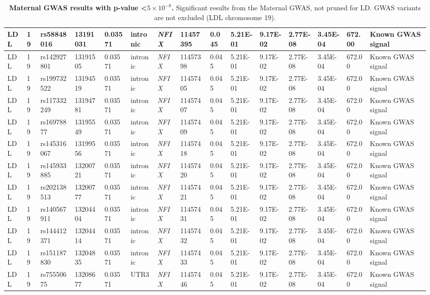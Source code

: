 \begin{landscape}
\begin{table}
\begin{adjustbox}{max width=\linewidth}
\begin{tabular}{@{}p{2cm}|p{0.5cm}p{2cm}p{2cm}p{1.5cm}p{3cm}p{2.1cm}p{1.5cm}p{1cm}p{2cm}p{2cm}p{2cm}p{2cm}p{1.5cm}p{4cm}@{}}
LDL&19&rs58848016&13191031&0.03571&intronic&\emph{NFIX}&11457395&0.045&5.21E-01&9.17E-02&2.77E-08&3.45E-04&672.00&Known GWAS signal\\ \hline
LDL&19&rs142927801&13191505&0.03571&intronic&\emph{NFIX}&11457398&0.045&5.21E-01&9.17E-02&2.77E-08&3.45E-04&672.00&Known GWAS signal\\ \hline
LDL&19&rs199732522&13194519&0.03571&intronic&\emph{NFIX}&11457405&0.045&5.21E-01&9.17E-02&2.77E-08&3.45E-04&672.00&Known GWAS signal\\ \hline
LDL&19&rs117332249&13194781&0.03571&intronic&\emph{NFIX}&11457407&0.045&5.21E-01&9.17E-02&2.77E-08&3.45E-04&672.00&Known GWAS signal\\ \hline
LDL&19&rs16978877&13195549&0.03571&intronic&\emph{NFIX}&11457409&0.045&5.21E-01&9.17E-02&2.77E-08&3.45E-04&672.00&Known GWAS signal\\ \hline
LDL&19&rs145316067&13199556&0.03571&intronic&\emph{NFIX}&11457418&0.045&5.21E-01&9.17E-02&2.77E-08&3.45E-04&672.00&Known GWAS signal\\ \hline
LDL&19&rs145933885&13200721&0.03571&intronic&\emph{NFIX}&11457420&0.045&5.21E-01&9.17E-02&2.77E-08&3.45E-04&672.00&Known GWAS signal\\ \hline
LDL&19&rs202138513&13200777&0.03571&intronic&\emph{NFIX}&11457421&0.045&5.21E-01&9.17E-02&2.77E-08&3.45E-04&672.00&Known GWAS signal\\ \hline
LDL&19&rs140567911&13204404&0.03571&intronic&\emph{NFIX}&11457431&0.045&5.21E-01&9.17E-02&2.77E-08&3.45E-04&672.00&Known GWAS signal\\ \hline
LDL&19&rs144412371&13204414&0.03571&intronic&\emph{NFIX}&11457432&0.045&5.21E-01&9.17E-02&2.77E-08&3.45E-04&672.00&Known GWAS signal\\ \hline
LDL&19&rs151187830&13204835&0.03571&intronic&\emph{NFIX}&11457433&0.045&5.21E-01&9.17E-02&2.77E-08&3.45E-04&672.00&Known GWAS signal\\ \hline
LDL&19&rs75550675&13208677&0.03571&UTR3&\emph{NFIX}&11457446&0.045&5.21E-01&9.17E-02&2.77E-08&3.45E-04&672.00&Known GWAS signal\\ \hline
\end{tabular}
\end{adjustbox}
\caption[Maternal GWAS results with p-value \textless $5 \times 10^{-8} $. ]{\textbf{Maternal GWAS results with p-value \textless $5 \times 10^{-8}$.} Significant results from the Maternal GWAS, not pruned for LD. GWAS variants are not excluded (LDL chromosome 19). }
\label{tab:tab-s5a}
\end{table}



\end{landscape}
